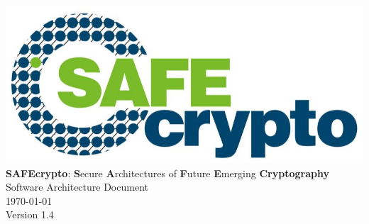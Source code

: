 \documentclass[a4paper, twoside, parskip=full]{book}
\newcommand\blankpage{%
    \null%
    \thispagestyle{empty}%
    \addtocounter{page}{-1}%
    \newpage}
\providecommand{\versionnumber}{1.4}
\begin{document}
\hypersetup{pageanchor=false}

\begin{titlepage}
\vspace*{7cm}
\begin{center}
\includegraphics[scale=0.5]{../Resources/SAFEcrypto.png}\\
\vspace*{1cm}
{\Large \textbf{SAFEcrypto}: \textbf{S}ecure \textbf{A}rchitectures of \textbf{F}uture \textbf{E}merging \textbf{Cryptography}}\\
\vspace*{1cm}
{\Huge Software Architecture Document}\\
\vspace*{0.5cm}
{\Large \today}\\
\vspace*{0.5cm}
{\Large Version \versionnumber}\\
\end{center}
\end{titlepage}

\afterpage{\blankpage}
\clearpage

\end{document}
